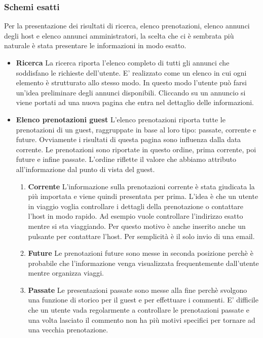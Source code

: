 \documentclass[1_relazione.tex]{subfiles}
\begin{document}
\subsubsection{Schemi esatti}
Per la presentazione dei risultati di ricerca, elenco prenotazioni,  elenco annunci degli host e elenco annunci amministratori, la scelta che ci è sembrata più naturale è stata presentare le informazioni in modo esatto. 

\begin{itemize}
\item \textbf{Ricerca}
La ricerca riporta l'elenco completo di tutti gli annunci che soddisfano le richieste dell'utente. E' realizzato come un elenco in cui ogni elemento è strutturato allo stesso modo. In questo modo l'utente può farsi un'idea preliminare degli annunci disponibili. Cliccando su un annuncio si viene portati ad una nuova pagina che entra nel dettaglio delle informazioni.

\item\textbf{Elenco prenotazioni guest}
L'elenco prenotazioni riporta tutte le prenotazioni di un guest, raggruppate in base al loro tipo: passate, corrente e future. Ovviamente i risultati di questa pagina sono influenza dalla data corrente. Le prenotazioni sono riportate in questo ordine, prima corrente, poi future e infine passate. L'ordine riflette il valore che abbiamo attributo all'informazione dal punto di vista del guest. 
\begin{enumerate}
\item \textbf{Corrente} L'informazione sulla prenotazioni corrente è stata giudicata la più importata e viene quindi presentata per prima. L'idea è che un utente in viaggio voglia controllare i dettagli della prenotazione o contattare l'host in modo rapido. Ad esempio vuole controllare l'indirizzo esatto mentre si sta viaggiando. Per questo motivo è anche inserito anche un pulsante per contattare l'host. Per semplicità è il solo invio di una email.
\item \textbf{Future} Le prenotazioni future sono messe in seconda posizione perchè è probabile che l'informazione venga visualizzata frequentemente dall'utente mentre organizza viaggi. 
\item \textbf{Passate} Le presentazioni passate sono messe alla fine perchè svolgono una funzione di storico per il guest e  per effettuare i commenti. E' difficile che un utente vada regolarmente a controllare le prenotazioni passate e una volta lasciato il commento non ha più motivi specifici per tornare ad una vecchia prenotazione.
\end{enumerate}


\end{itemize}
\end{document}
